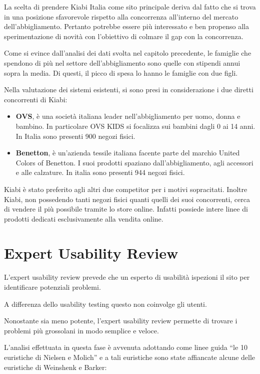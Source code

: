\documentclass[12pt,italian,]{report}
\providecommand{\tightlist}{%
  \setlength{\itemsep}{0pt}\setlength{\parskip}{0pt}}
\begin{document}
La scelta di prendere Kiabi Italia come sito principale deriva dal fatto che si trova in una posizione sfavorevole rispetto alla concorrenza all'interno del mercato dell'abbigliamento. Pertanto potrebbe essere più interessato e ben propenso alla sperimentazione di novità con l'obiettivo di colmare il gap con la concorrenza.

Come si evince dall'analisi dei dati svolta nel capitolo precedente, le famiglie che spendono di più nel settore dell'abbigliamento sono quelle con stipendi annui sopra la media. Di questi, il picco di spesa lo hanno le famiglie con due figli.

Nella valutazione dei sistemi esistenti, si sono presi in considerazione i due diretti concorrenti di Kiabi:

\begin{itemize}
\tightlist
\item \textbf{OVS}, è una società italiana leader nell'abbigliamento per uomo, donna e bambino. In particolare OVS KIDS si focalizza sui bambini dagli 0 ai 14 anni. In Italia sono presenti 900 negozi fisici.  
\item \textbf{Benetton}, è un'azienda tessile italiana facente parte del marchio United Colors of Benetton. I suoi prodotti spaziano dall'abbigliamento, agli accessori e alle calzature. In italia sono presenti 944 negozi fisici.
\end{itemize}

Kiabi è stato preferito agli altri due competitor per i motivi sopracitati. Inoltre Kiabi, non possedendo tanti negozi fisici quanti quelli dei suoi concorrenti, cerca di vendere il più possibile tramite lo store online. Infatti possiede intere linee di prodotti dedicati esclusivamente alla vendita online.

\section{Expert Usability Review}\label{expert-usability-review}

L'expert usability review prevede che un esperto di usabilità ispezioni il sito per identificare potenziali problemi.

A differenza dello usability testing questo non coinvolge gli utenti.

Nonostante sia meno potente, l'expert usability review permette di trovare i problemi più grossolani in modo semplice e veloce.

L'analisi effettuata in questa fase è avvenuta adottando come linee guida
``le 10 euristiche di Nielsen e Molich'' e a tali euristiche sono state
affiancate alcune delle euristiche di Weinshenk e Barker:
\end{document}

